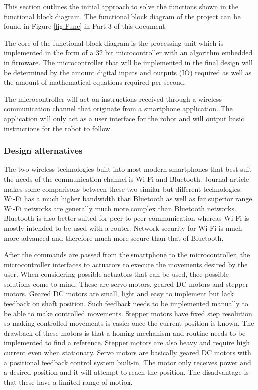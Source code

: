 This section outlines the initial approach to solve the functions shown in the functional block diagram. The functional block diagram of the project can be found in Figure \ref{fig:Func} in Part 3 of this document.

The core of the functional block diagram is the processing unit which is implemented in the form of a 32 bit microcontroller with an algorithm embedded in firmware. The microcontroller that will be implemented in the final design will be determined by the amount digital inputs and outputs (IO) required as well as the amount of mathematical equations required per second.

The microcontroller will act on instructions received through a wireless communication channel that originate from a smartphone application. The application will only act as a user interface for the robot and will output basic instructions for the robot to follow.

\subsubsection{Design alternatives}
The two wireless technologies built into most modern smartphones that best suit the needs of the communication channel is Wi-Fi and Bluetooth. Journal article \cite{Dhawan:Analogy} makes some comparisons between these two similar but different technologies. Wi-Fi has a much higher bandwidth than Bluetooth as well as far superior range. Wi-Fi networks are generally much more complex than Bluetooth networks. Bluetooth is also better suited for peer to peer communication whereas Wi-Fi is mostly intended to be used with a router. Network security for Wi-Fi is much more advanced and therefore much more secure than that of Bluetooth.

After the commands are passed from the smartphone to the microcontroller, the microcontroller interfaces to actuators to execute the movements desired by the user. When considering possible actuators that can be used, thee possible solutions come to mind. These are servo motors, geared DC motors and stepper motors. Geared DC motors are small, light and easy to implement but lack feedback on shaft position. Such feedback needs to be implemented manually to be able to make controlled movements. Stepper motors have fixed step resolution so making controlled movements is easier once the current position is known. The drawback of these motors is that a homing mechanism and routine needs to be implemented to find a reference. Stepper motors are also heavy and require high current even when stationary. Servo motors are basically geared DC motors with a positional feedback control system built-in. The motor only receives power and a desired position and it will attempt to reach the position. The disadvantage is that these have a limited range of motion.

